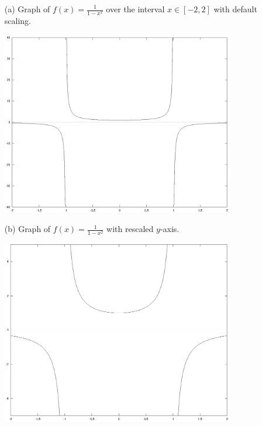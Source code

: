 \documentclass[11pt,a4paper]{article}
\begin{document}
\begin{enumerate}

	\item[(a)] Graph of $f(x)=\frac{1}{1-x^2}$ over the interval $x \in [-2,2]$ with default scaling.
	\begin{center}
		\includegraphics[width=0.8\textwidth]{plot3a.eps}
	\end{center}
	
	\item[(b)] Graph of $f(x)=\frac{1}{1-x^2}$ with rescaled $y$-axis.
	\begin{center}
		\includegraphics[width=0.8\textwidth]{plot3b.eps}
	\end{center}
	
	\pagebreak
	

\end{enumerate}
\end{document}
